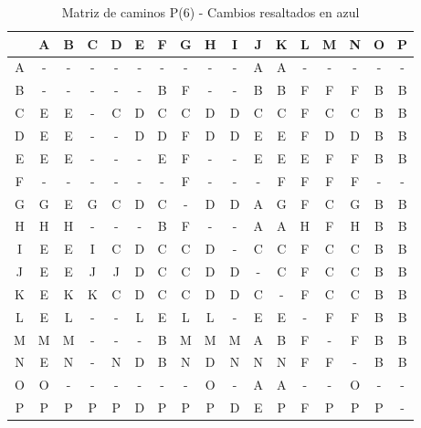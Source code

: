 \documentclass[12pt]{article}
\begin{document}
\begin{table}[h!]
\centering
\begin{tabular}{|c|c|c|c|c|c|c|c|c|c|c|c|c|c|c|c|c|}
\hline
 & A & B & C & D & E & F & G & H & I & J & K & L & M & N & O & P \\\hline
A & - & - & - & - & - & - & - & - & - & A & A & - & - & - & - & - \\\hline
B & - & - & - & - & - & B & \cellcolor{lightblue} F & - & - & B & B & \cellcolor{lightblue} F & \cellcolor{lightblue} F & \cellcolor{lightblue} F & B & B \\\hline
C & E & E & - & C & D & C & C & D & D & C & C & \cellcolor{lightblue} F & C & C & B & B \\\hline
D & E & E & - & - & D & D & \cellcolor{lightblue} F & D & D & E & E & \cellcolor{lightblue} F & D & D & B & B \\\hline
E & E & E & - & - & - & E & \cellcolor{lightblue} F & - & - & E & E & E & \cellcolor{lightblue} F & \cellcolor{lightblue} F & B & B \\\hline
F & - & - & - & - & - & - & F & - & - & - & F & F & F & F & - & - \\\hline
G & G & E & G & C & D & C & - & D & D & A & G & \cellcolor{lightblue} F & C & G & B & B \\\hline
H & H & H & - & - & - & B & \cellcolor{lightblue} F & - & - & A & A & H & \cellcolor{lightblue} F & H & B & B \\\hline
I & E & E & I & C & D & C & C & D & - & C & C & \cellcolor{lightblue} F & C & C & B & B \\\hline
J & E & E & J & J & D & C & C & D & D & - & C & \cellcolor{lightblue} F & C & C & B & B \\\hline
K & E & K & K & C & D & C & C & D & D & C & - & \cellcolor{lightblue} F & C & C & B & B \\\hline
L & E & L & - & - & L & E & L & L & - & E & E & - & \cellcolor{lightblue} F & \cellcolor{lightblue} F & B & B \\\hline
M & M & M & - & - & - & B & M & M & M & A & B & \cellcolor{lightblue} F & - & \cellcolor{lightblue} F & B & B \\\hline
N & E & N & - & N & D & B & N & D & N & N & N & \cellcolor{lightblue} F & \cellcolor{lightblue} F & - & B & B \\\hline
O & O & - & - & - & - & - & - & O & - & A & A & - & - & O & - & - \\\hline
P & P & P & P & P & D & P & P & P & D & E & P & \cellcolor{lightblue} F & P & P & P & - \\\hline
\end{tabular}
\caption{Matriz de caminos P(6) - Cambios resaltados en azul}
\end{table}
\end{document}
